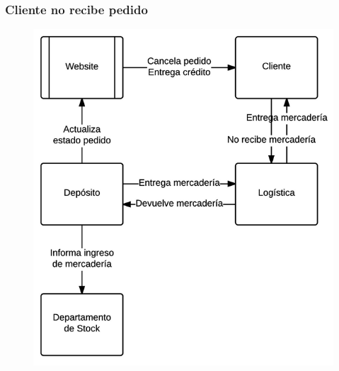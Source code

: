     \subsubsection{Cliente no recibe pedido}
    \begin{figure}[H]
      \includegraphics[width=\linewidth]{images/cliente-no-recibe-pedido.png}
    \end{figure}

    \clearpage
